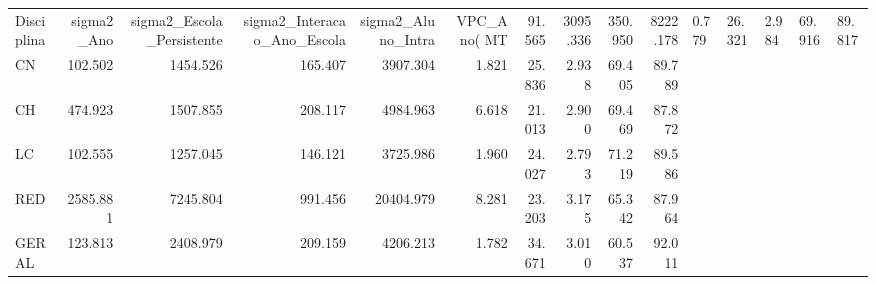 \begin{tabular}{lrrrrrrrrr}
\toprule
Disciplina & sigma2_Ano & sigma2_Escola_Persistente & sigma2_Interacao_Ano_Escola & sigma2_Aluno_Intra & VPC_Ano(%
\midrule
MT & 91.565 & 3095.336 & 350.950 & 8222.178 & 0.779 & 26.321 & 2.984 & 69.916 & 89.817 \\
CN & 102.502 & 1454.526 & 165.407 & 3907.304 & 1.821 & 25.836 & 2.938 & 69.405 & 89.789 \\
CH & 474.923 & 1507.855 & 208.117 & 4984.963 & 6.618 & 21.013 & 2.900 & 69.469 & 87.872 \\
LC & 102.555 & 1257.045 & 146.121 & 3725.986 & 1.960 & 24.027 & 2.793 & 71.219 & 89.586 \\
RED & 2585.881 & 7245.804 & 991.456 & 20404.979 & 8.281 & 23.203 & 3.175 & 65.342 & 87.964 \\
GERAL & 123.813 & 2408.979 & 209.159 & 4206.213 & 1.782 & 34.671 & 3.010 & 60.537 & 92.011 \\
\bottomrule
\end{tabular}
